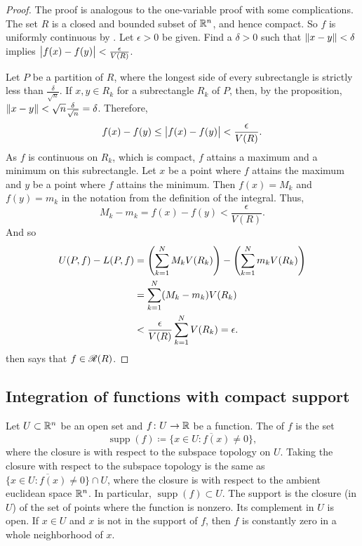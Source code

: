 \begin{proof}
The proof is analogous to the one-variable proof with some complications.
The set $R$ is a closed and bounded subset of ${\mathbb{R}}^n$, and hence compact.  So
$f$ is uniformly continuous 
by .
Let $\epsilon > 0$ be given.  Find a $\delta > 0$ such that
$\lVert {x-y} \rVert < \delta$ implies $\bigl\lvert {f(x)-f(y)} \bigr\rvert < \frac{\epsilon}{V(R)}$.

Let $P$ be a partition of $R$, where the longest side of every subrectangle
is strictly less than $\frac{\delta}{\sqrt{n}}$.
If $x, y \in R_k$ for a subrectangle $R_k$ of $P$, then,
by the proposition,
$\lVert {x-y} \rVert < \sqrt{n} \frac{\delta}{\sqrt{n}} = \delta$.  Therefore,
\begin{equation*}
f(x)-f(y) \leq \bigl\lvert {f(x)-f(y)} \bigr\rvert < \frac{\epsilon}{V(R)} .
\end{equation*}
As $f$ is continuous on $R_k$, which is compact, $f$ attains a maximum and a minimum
on this subrectangle.
Let $x$ be a point where $f$ attains the maximum and $y$ be a point
where $f$ attains the minimum.  Then $f(x) = M_k$
and $f(y) = m_k$ in the notation from the definition of the integral.
Thus,
\begin{equation*}
M_k-m_k = f(x)-f(y) < 
\frac{\epsilon}{V(R)} .
\end{equation*}
And so
\begin{equation*}
\begin{split}
U(P,f) - L(P,f)
& =
\left(
\sum_{k=1}^N
M_k V(R_k)
\right)
-
\left(
\sum_{k=1}^N
m_k V(R_k)
\right)
\\
& =
\sum_{k=1}^N
(M_k-m_k) V(R_k)
\\
& <
\frac{\epsilon}{V(R)}
\sum_{k=1}^N
V(R_k)
= \epsilon.
\end{split}
\avoidbreak
\end{equation*}
 then says that $f \in {\mathscr{R}}(R)$.
\end{proof}

\subsection{Integration of functions with compact support}

Let $U \subset {\mathbb{R}}^n$ be an open set and
$f \colon U \to {\mathbb{R}}$ be a function.  The
\emph{} of $f$ is the set
\begin{equation*}
\operatorname{supp} (f) \coloneqq
\overline{
\{ x \in U : f(x) \neq 0 \}
} ,
\end{equation*}
where the closure is with respect to the subspace topology on $U$.
Taking the closure with respect to the subspace
topology is the same as 
$\overline{
\{ x \in U : f(x) \neq 0 \}
} \cap U$, where the closure is with respect to the ambient euclidean space
${\mathbb{R}}^n$.
In particular,
$\operatorname{supp} (f) \subset U$.
The support is the closure (in $U$) of the set of points where the
function is nonzero.  Its complement in $U$ is open.
If $x \in U$ and $x$ is not in the support of $f$,
then
$f$ is constantly zero in a whole neighborhood of $x$.

